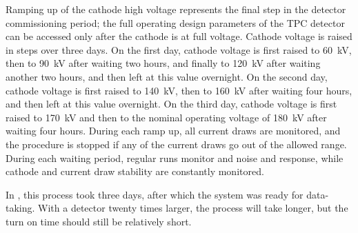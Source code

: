Ramping up of the cathode high voltage represents the final step in the detector commissioning period; the full operating design parameters of the TPC detector can be accessed only after the cathode is at full voltage. 
Cathode voltage is raised in steps over three days. 
On the first day, cathode voltage is first raised to \SI{60}{kV}, then to \SI{90}{kV} after waiting two hours, and finally to \SI{120}{kV} after waiting another two hours, and then left at this value overnight.
On the second day, cathode voltage is first raised to \SI{140}{kV}, then to \SI{160}{kV} after waiting four hours, and then left at this value overnight. 
On the third day, cathode voltage is first raised to \SI{170}{kV} and then to the nominal operating voltage of \SI{180}{kV} after waiting four hours. 
During each  ramp up, all  current draws are monitored, and the procedure is stopped if any of the current draws go out of the allowed range. 
During each waiting period, regular  runs monitor  and  noise and response, while cathode  and current draw stability are constantly monitored.

In , this process took three days, after which the system was  ready for data-taking. With a detector twenty times larger, the process will take longer, but the turn on time should still be relatively short. 










